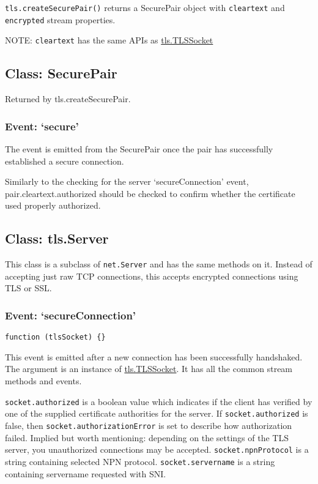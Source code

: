 \texttt{tls.createSecurePair()} returns a SecurePair object with
\texttt{cleartext} and \texttt{encrypted} stream properties.

NOTE: \texttt{cleartext} has the same APIs as
\hyperref[tlsux5fclassux5ftlsux5ftlssocket]{tls.TLSSocket}

\subsection{Class: SecurePair}\label{class-securepair}

Returned by tls.createSecurePair.

\subsubsection{\texorpdfstring{Event:
`secure'}{Event: secure}}\label{event-secure}

The event is emitted from the SecurePair once the pair has successfully
established a secure connection.

Similarly to the checking for the server `secureConnection' event,
pair.cleartext.authorized should be checked to confirm whether the
certificate used properly authorized.

\subsection{Class: tls.Server}\label{class-tls.server}

This class is a subclass of \texttt{net.Server} and has the same methods
on it. Instead of accepting just raw TCP connections, this accepts
encrypted connections using TLS or SSL.

\subsubsection{\texorpdfstring{Event:
`secureConnection'}{Event: secureConnection}}\label{event-secureconnection}

\texttt{function\ (tlsSocket)\ \{\}}

This event is emitted after a new connection has been successfully
handshaked. The argument is an instance of
\hyperref[tlsux5fclassux5ftlsux5ftlssocket]{tls.TLSSocket}. It has all
the common stream methods and events.

\texttt{socket.authorized} is a boolean value which indicates if the
client has verified by one of the supplied certificate authorities for
the server. If \texttt{socket.authorized} is false, then
\texttt{socket.authorizationError} is set to describe how authorization
failed. Implied but worth mentioning: depending on the settings of the
TLS server, you unauthorized connections may be accepted.
\texttt{socket.npnProtocol} is a string containing selected NPN
protocol. \texttt{socket.servername} is a string containing servername
requested with SNI.

